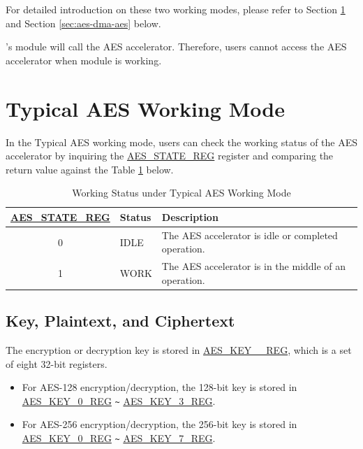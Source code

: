 \documentclass[main\_\_EN.tex]{subfiles}
\begin{document}
For detailed introduction on these two working modes, please refer to Section \ref{sec:aes-typical-modes} and Section \ref{sec:aes-dma-aes} below.

\begin{importantlisting}
\vspace{-0.5em}

    \chipname{}'s  module will call the AES accelerator. Therefore, users cannot access the AES accelerator when  module is working.
\end{importantlisting}

\clearpage
\section{Typical AES Working Mode}\label{sec:aes-typical-modes}

In the Typical AES working mode, 
users can check the working status of the AES accelerator by inquiring the \hyperref[regdesc:AESSTATEREG]{AES\_STATE\_REG} register and comparing the return value against the Table \ref{tab:aes-state-value-typical} below.

\begin{longtable}[c]{ | c | l | l| }
\caption{Working Status under Typical AES Working Mode}
\label{tab:aes-state-value-typical}
\\\hline 
\rowcolor{lightgray}
\textbf{\hyperref[regdesc:AESSTATEREG]{AES\_STATE\_REG}} & \textbf{Status} &  \textbf{Description} \\ \hline

    0                   & IDLE      &   The AES accelerator is idle or completed operation.\\ \hline
    1                   & WORK      &   The AES accelerator is in the middle of an operation.     \\ \hline
\end{longtable}

\subsection{Key, Plaintext, and Ciphertext}

The encryption or decryption key is stored in \hyperref[regdesc:AESKEYnREG]{AES\_KEY\_\_REG}, which is a set of eight 32-bit registers.

\begin{itemize}
    \item For AES-128 encryption/decryption, the 128-bit key is stored in \hyperref[regdesc:AESKEYnREG]{AES\_KEY\_0\_REG} \verb+~+ \hyperref[regdesc:AESKEYnREG]{AES\_KEY\_3\_REG}.
    \item For AES-256 encryption/decryption, the 256-bit key is stored in \hyperref[regdesc:AESKEYnREG]{AES\_KEY\_0\_REG} \verb+~+ \hyperref[regdesc:AESKEYnREG]{AES\_KEY\_7\_REG}.
\end{itemize}
\end{document}
